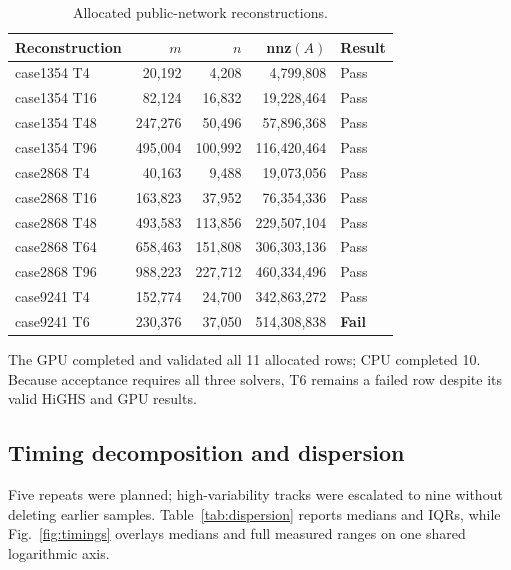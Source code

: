 \documentclass[10pt,journal]{IEEEtran}
\begin{document}
\begin{table}[!t]
\caption{Allocated public-network reconstructions.}
\label{tab:benchmarks}
\centering
\scriptsize
\setlength{\tabcolsep}{2.4pt}
\renewcommand{\arraystretch}{0.92}
\begin{tabular}{@{}lrrrl@{}}
\toprule
Reconstruction & $m$ & $n$ & nnz$(A)$ & Result \\
\midrule
case1354 T4  & 20,192  & 4,208   & 4,799,808   & Pass \\
case1354 T16 & 82,124  & 16,832  & 19,228,464  & Pass \\
case1354 T48 & 247,276 & 50,496  & 57,896,368  & Pass \\
case1354 T96 & 495,004 & 100,992 & 116,420,464 & Pass \\
case2868 T4  & 40,163  & 9,488   & 19,073,056  & Pass \\
case2868 T16 & 163,823 & 37,952  & 76,354,336  & Pass \\
case2868 T48 & 493,583 & 113,856 & 229,507,104 & Pass \\
case2868 T64 & 658,463 & 151,808 & 306,303,136 & Pass \\
case2868 T96 & 988,223 & 227,712 & 460,334,496 & Pass \\
case9241 T4  & 152,774 & 24,700  & 342,863,272 & Pass \\
case9241 T6  & 230,376 & 37,050  & 514,308,838 & \textbf{Fail} \\
\bottomrule
\end{tabular}
\end{table}

The GPU completed and validated all 11 allocated rows; CPU completed 10.
Because acceptance requires all three solvers, T6 remains a failed row despite
its valid HiGHS and GPU results.

\subsection{Timing decomposition and dispersion}

Five repeats were planned; high-variability tracks were escalated to nine
without deleting earlier samples. Table~\ref{tab:dispersion} reports medians
and IQRs, while Fig.~\ref{fig:timings} overlays medians and full measured
ranges on one shared logarithmic axis.
\end{document}
